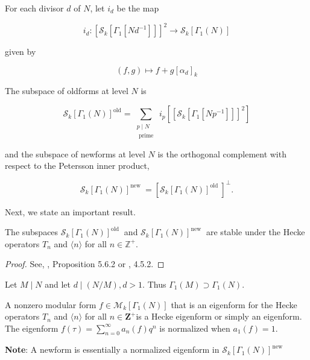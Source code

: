 \begin{definition}
    For each divisor $d$ of $N$, let $i_{d}$ be the map

$$
i_{d}:\left[\mathcal{S}_{k}\left[\Gamma_{1}\left[N d^{-1}\right]\right]\right]^{2} \longrightarrow \mathcal{S}_{k}\left[\Gamma_{1}(N)\right]
$$

given by

$$
(f, g) \mapsto f+g\left[\alpha_{d}\right]_{k}
$$

The subspace of oldforms at level $N$ is

$$
\mathcal{S}_{k}\left[\Gamma_{1}(N)\right]^{\mathrm{old}}=\sum_{\substack{p \mid N \\ \text { prime }}} i_{p}\left[\left[\mathcal{S}_{k}\left[\Gamma_{1}\left[N p^{-1}\right]\right]\right]^{2}\right]
$$

and the subspace of newforms at level $N$ is the orthogonal complement with respect to the Petersson inner product,

$$
\mathcal{S}_{k}\left[\Gamma_{1}(N)\right]^{\text {new }}=\left[\mathcal{S}_{k}\left[\Gamma_{1}(N)\right]^{\text {old }}\right]^{\perp} .
$$

\end{definition}

Next, we state an important result.

\begin{theorem}
    The subspaces $\mathcal{S}_{k}\left[\Gamma_{1}(N)\right]^{\text {old }}$ and $\mathcal{S}_{k}\left[\Gamma_{1}(N)\right]^{\text {new }}$ are stable under the Hecke operators $T_{n}$ and $\langle n\rangle$ for all $n \in \mathbb{Z}^{+}$.
\begin{proof}
 See,  \cite{diamond2005first}, Proposition 5.6.2 or \cite{Masdeu2015ModularForms}, 4.5.2.
\end{proof}
\end{theorem}


Let $M \mid N$ and let $d \mid(N / M), d>1$. Thus $\Gamma_{1}(M) \supset \Gamma_{1}(N)$.


\begin{definition}
     A nonzero modular form $f \in \mathcal{M}_{k}\left[\Gamma_{1}(N)\right]$ that is an eigenform for the Hecke operators $T_{n}$ and $\langle n\rangle$ for all $n \in \mathbf{Z}^{+}$is a Hecke eigenform or simply an eigenform. The eigenform $f(\tau)=\sum_{n=0}^{\infty} a_{n}(f) q^{n}$ is normalized when $a_{1}(f)=1$. \\


\end{definition}
\textbf{Note}: A newform is essentially a normalized eigenform in $\mathcal{S}_{k}\left[\Gamma_{1}(N)\right]^{\text {new }}$

